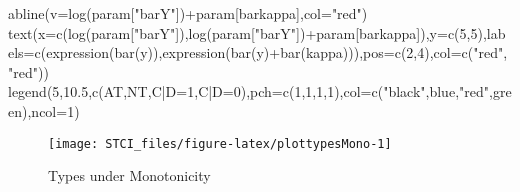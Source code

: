 \documentclass[
]{book}
\newenvironment{Shaded}{\begin{snugshade}}{\end{snugshade}}
\newcommand{\AttributeTok}[1]{\textcolor[rgb]{0.77,0.63,0.00}{#1}}
\newcommand{\DecValTok}[1]{\textcolor[rgb]{0.00,0.00,0.81}{#1}}
\newcommand{\FloatTok}[1]{\textcolor[rgb]{0.00,0.00,0.81}{#1}}
\newcommand{\FunctionTok}[1]{\textcolor[rgb]{0.00,0.00,0.00}{#1}}
\newcommand{\NormalTok}[1]{#1}
\newcommand{\SpecialCharTok}[1]{\textcolor[rgb]{0.00,0.00,0.00}{#1}}
\newcommand{\StringTok}[1]{\textcolor[rgb]{0.31,0.60,0.02}{#1}}
\theoremstyle{definition}
\theoremstyle{definition}
\theoremstyle{definition}
\theoremstyle{definition}
\theoremstyle{remark}
\begin{document}
\begin{Shaded}
\begin{Highlighting}[]
\FunctionTok{abline}\NormalTok{(}\AttributeTok{v=}\FunctionTok{log}\NormalTok{(param[}\StringTok{"barY"}\NormalTok{])}\SpecialCharTok{+}\NormalTok{param[}\StringTok{\textquotesingle{}barkappa\textquotesingle{}}\NormalTok{],}\AttributeTok{col=}\StringTok{"red"}\NormalTok{)}
\FunctionTok{text}\NormalTok{(}\AttributeTok{x=}\FunctionTok{c}\NormalTok{(}\FunctionTok{log}\NormalTok{(param[}\StringTok{"barY"}\NormalTok{]),}\FunctionTok{log}\NormalTok{(param[}\StringTok{"barY"}\NormalTok{])}\SpecialCharTok{+}\NormalTok{param[}\StringTok{\textquotesingle{}barkappa\textquotesingle{}}\NormalTok{]),}\AttributeTok{y=}\FunctionTok{c}\NormalTok{(}\DecValTok{5}\NormalTok{,}\DecValTok{5}\NormalTok{),}\AttributeTok{labels=}\FunctionTok{c}\NormalTok{(}\FunctionTok{expression}\NormalTok{(}\FunctionTok{bar}\NormalTok{(}\StringTok{\textquotesingle{}y\textquotesingle{}}\NormalTok{)),}\FunctionTok{expression}\NormalTok{(}\FunctionTok{bar}\NormalTok{(}\StringTok{\textquotesingle{}y\textquotesingle{}}\NormalTok{)}\SpecialCharTok{+}\FunctionTok{bar}\NormalTok{(kappa))),}\AttributeTok{pos=}\FunctionTok{c}\NormalTok{(}\DecValTok{2}\NormalTok{,}\DecValTok{4}\NormalTok{),}\AttributeTok{col=}\FunctionTok{c}\NormalTok{(}\StringTok{"red"}\NormalTok{,}\StringTok{"red"}\NormalTok{))}
\FunctionTok{legend}\NormalTok{(}\DecValTok{5}\NormalTok{,}\FloatTok{10.5}\NormalTok{,}\FunctionTok{c}\NormalTok{(}\StringTok{\textquotesingle{}AT\textquotesingle{}}\NormalTok{,}\StringTok{\textquotesingle{}NT\textquotesingle{}}\NormalTok{,}\StringTok{\textquotesingle{}C|D=1\textquotesingle{}}\NormalTok{,}\StringTok{\textquotesingle{}C|D=0\textquotesingle{}}\NormalTok{),}\AttributeTok{pch=}\FunctionTok{c}\NormalTok{(}\DecValTok{1}\NormalTok{,}\DecValTok{1}\NormalTok{,}\DecValTok{1}\NormalTok{,}\DecValTok{1}\NormalTok{),}\AttributeTok{col=}\FunctionTok{c}\NormalTok{(}\StringTok{"black"}\NormalTok{,}\StringTok{\textquotesingle{}blue\textquotesingle{}}\NormalTok{,}\StringTok{"red"}\NormalTok{,}\StringTok{\textquotesingle{}green\textquotesingle{}}\NormalTok{),}\AttributeTok{ncol=}\DecValTok{1}\NormalTok{)}
\end{Highlighting}
\end{Shaded}

\begin{figure}[htbp]

{\centering \texttt{[image: STCI\_files/figure-latex/plottypesMono-1]} 

}

\caption{Types under Monotonicity}\label{fig:plottypesMono}
\end{figure}
\end{document}
